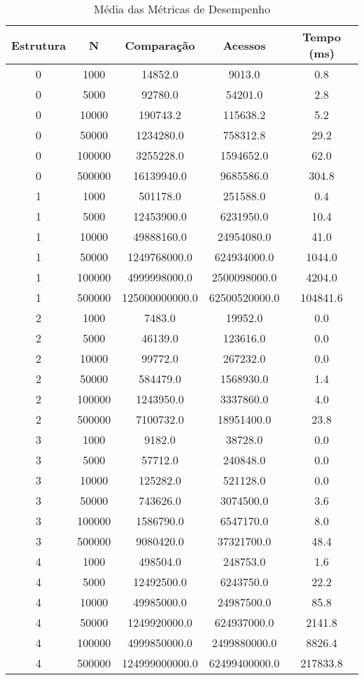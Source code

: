 \begin{table}[htbp]
\caption{Média das Métricas de Desempenho}
\label{tab:table1}
\begin{tabular}{c|c|c|c|c}
\textbf{Estrutura} & \textbf{N} & \textbf{Comparação} & \textbf{Acessos} & \textbf{Tempo (ms)}\\
\hline
0 & 1000 & 14852.0 & 9013.0 & 0.8\\
0 & 5000 & 92780.0 & 54201.0 & 2.8\\
0 & 10000 & 190743.2 & 115638.2 & 5.2\\
0 & 50000 & 1234280.0 & 758312.8 & 29.2\\
0 & 100000 & 3255228.0 & 1594652.0 & 62.0\\
0 & 500000 & 16139940.0 & 9685586.0 & 304.8\\
1 & 1000 & 501178.0 & 251588.0 & 0.4\\
1 & 5000 & 12453900.0 & 6231950.0 & 10.4\\
1 & 10000 & 49888160.0 & 24954080.0 & 41.0\\
1 & 50000 & 1249768000.0 & 624934000.0 & 1044.0\\
1 & 100000 & 4999998000.0 & 2500098000.0 & 4204.0\\
1 & 500000 & 125000000000.0 & 62500520000.0 & 104841.6\\
2 & 1000 & 7483.0 & 19952.0 & 0.0\\
2 & 5000 & 46139.0 & 123616.0 & 0.0\\
2 & 10000 & 99772.0 & 267232.0 & 0.0\\
2 & 50000 & 584479.0 & 1568930.0 & 1.4\\
2 & 100000 & 1243950.0 & 3337860.0 & 4.0\\
2 & 500000 & 7100732.0 & 18951400.0 & 23.8\\
3 & 1000 & 9182.0 & 38728.0 & 0.0\\
3 & 5000 & 57712.0 & 240848.0 & 0.0\\
3 & 10000 & 125282.0 & 521128.0 & 0.0\\
3 & 50000 & 743626.0 & 3074500.0 & 3.6\\
3 & 100000 & 1586790.0 & 6547170.0 & 8.0\\
3 & 500000 & 9080420.0 & 37321700.0 & 48.4\\
4 & 1000 & 498504.0 & 248753.0 & 1.6\\
4 & 5000 & 12492500.0 & 6243750.0 & 22.2\\
4 & 10000 & 49985000.0 & 24987500.0 & 85.8\\
4 & 50000 & 1249920000.0 & 624937000.0 & 2141.8\\
4 & 100000 & 4999850000.0 & 2499880000.0 & 8826.4\\
4 & 500000 & 124999000000.0 & 62499400000.0 & 217833.8\\
\end{tabular}
\end{table}
